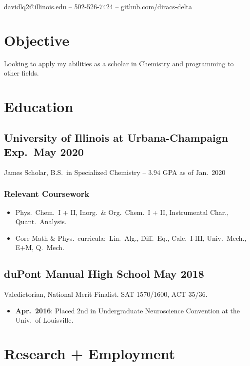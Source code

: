\documentclass{article}
\makeatletter
\renewcommand{\maketitle}
{
	\begin{center}
	{\huge\bfseries\theauthor}

	\vspace{0.5em}
	davidlq2@illinois.edu -- 502-526-7424 -- github.com/diracs-delta
	\end{center}
}
\makeatother
\begin{document}
\author{David Qiu}
\maketitle

\section{Objective}
Looking to apply my abilities as a scholar in Chemistry and programming to other
fields.

\section{Education}

\subsection{University of Illinois at Urbana-Champaign \hfill Exp.\ May 2020}
James Scholar, B.S.\ in Specialized Chemistry -- 3.94 GPA as of Jan.\ 2020

\subsubsection{Relevant Coursework}

\begin{itemize}[noitemsep,nolistsep]
	\item Phys.\ Chem.\ I + II, Inorg.\ \& Org.\ Chem.\ I + II, Instrumental
	Char., Quant.\ Analysis.

	\item Core Math \& Phys.\ curricula:\ Lin.\ Alg., Diff.\ Eq., Calc.\
	I-III, Univ.\ Mech., E+M, Q.\ Mech.
\end{itemize}

\subsection{duPont Manual High School \hfill May 2018}
Valedictorian, National Merit Finalist. SAT 1570/1600, ACT 35/36.

\begin{itemize}[noitemsep,nolistsep]
	\item\textbf{Apr.\ 2016}: Placed 2nd in Undergraduate Neuroscience
	Convention at the Univ.\ of Louisville.
\end{itemize}

\section{Research + Employment}
\end{document}
